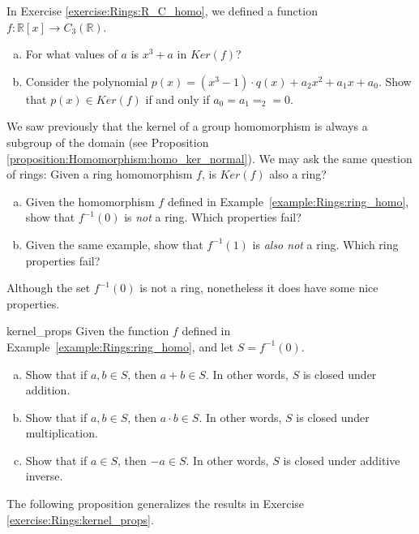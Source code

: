 \begin{exercise}{}
In Exercise \ref{exercise:Rings:R_C_homo}, we defined a function $f:{\mathbb R}[x]\rightarrow C_3({\mathbb R})$.
\begin{enumerate}[(a)]
\item For what values of $a$ is $x^3+a$ in $Ker(f)$?
\item Consider the polynomial $p(x)=(x^3-1)\cdot q(x)+a_2x^2+a_1x+a_0$.  Show that $p(x)\in Ker(f)$ if and only if $a_0=a_1=_2=0$.
\end{enumerate}
\end{exercise}

We saw previously that the kernel of a group homomorphism is always a subgroup of the domain (see Proposition \ref{proposition:Homomorphism:homo_ker_normal}).  We may ask the same question of rings:  Given a ring homomorphism $f$, is $Ker(f)$ also a ring?

\begin{exercise}{}
\begin{enumerate}[(a)]
    \item Given the homomorphism $f$ defined in Example~\ref{example:Rings:ring_homo}, show that $f^{-1}(0)$ is \emph{not} a ring.  Which properties fail?
    \item Given the same example, show that $f^{-1}(1)$ is \emph{also not} a ring.  Which ring properties fail?
\end{enumerate}
\end{exercise}

Although the set $f^{-1}(0)$ is not a ring, nonetheless it does have some nice properties.

\begin{exercise}{kernel_props}
Given the function $f$ defined in Example~\ref{example:Rings:ring_homo}, and let $S=f^{-1}(0)$.
\begin{enumerate}[(a)]
\item Show that if $a,b \in S$, then $a+b \in S$.  In other words, $S$ is closed under addition.
\item Show that if $a,b \in S$, then $a\cdot b \in S$.  In other words, $S$ is closed under multiplication.

\item Show that if $a \in S$, then $-a \in S$.  In other words, $S$ is closed under additive inverse.
\end{enumerate}
\end{exercise}

The following proposition generalizes the results in Exercise \ref{exercise:Rings:kernel_props}.

